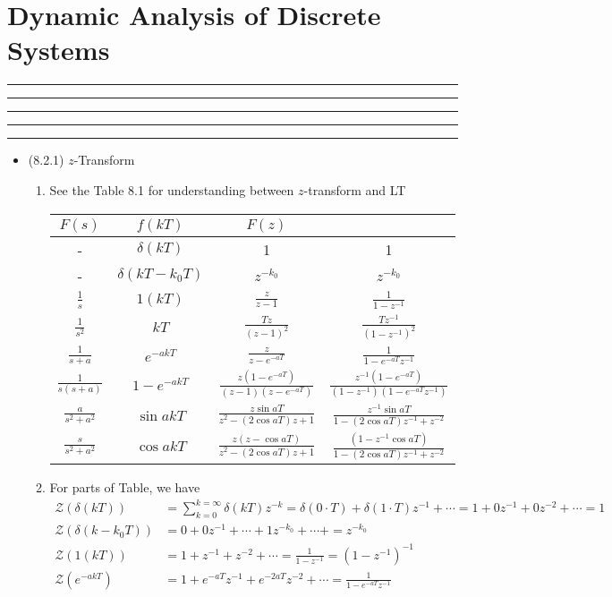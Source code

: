 \setcounter{chapter}{7}
\setcounter{section}{1}
\section{Dynamic Analysis of Discrete Systems}
\vspace{-8pt} \hrule \hrule \hrule \hrule \hrule  \vspace{12pt}

\begin{itemize}	

\item (8.2.1) $z$-Transform 
	\begin{enumerate}
		\item See the Table 8.1 for understanding between $z$-transform and LT
		\begin{table}[h]
		\centering
			\begin{tabular}{c||c||c|c} 
				\hline \hline 
				$F(s)$ & $f(kT)$ & $F(z)$ & \\ \hline
				- & $\delta(kT)$ & 1 & 1 \\
				- & $\delta(kT-k_0 T)$ & $z^{-k_0}$ & $z^{-k_0}$ \\
				$\frac{1}{s}$ & $1(kT)$ & $\frac{z}{z-1}$ & $\frac{1}{1-z^{-1}}$ \\
				$\frac{1}{s^2}$ & $kT$ & $\frac{Tz}{(z-1)^2}$ & $\frac{Tz^{-1}}{(1-z^{-1})^2} $ \\
				$\frac{1}{s+a}$ & $e^{-akT}$ & $\frac{z}{z-e^{-aT}}$ & $\frac{1}{1-e^{-aT}z^{-1}}$ \\
				$\frac{1}{s(s+a)}$ & $1-e^{-akT}$ & $\frac{z(1-e^{-aT})}{(z-1)(z-e^{-aT})}$ & $\frac{z^{-1}(1-e^{-aT})}{(1-z^{-1})(1-e^{-aT} z^{-1})}$ \\
				$\frac{a}{s^2+a^2}$ & $\sin a kT$ & $\frac{z \sin aT}{z^2-(2\cos aT)z +1}$ & $\frac{z^{-1}  \sin aT}{1-(2\cos aT)z^{-1} + z^{-2}}$ \\
				$\frac{s}{s^2+a^2}$ & $\cos a kT$ & $\frac{z(z- \cos aT)}{z^2-(2\cos aT)z +1}$ & $\frac{(1- z^{-1}\cos aT )}{1-(2\cos aT)z^{-1} +z^{-2}}$ \\
				\hline \hline 
			\end{tabular}
		\end{table}
		\item For parts of Table, we have
		\begin{align*}
			\mathcal{Z}(\delta(kT)) &=\sum_{k=0}^{k=\infty}\delta(kT)z^{-k}= \delta(0 \cdot T) + \delta(1 \cdot T)z^{-1} + \cdots  = 1  + 0 z^{-1} + 0 z^{-2} + \cdots = 1  \\  
			\mathcal{Z}(\delta(k-k_0T)) &= 0  + 0 z^{-1} +  \cdots + 1 z^{-k_0} + \cdots +  = z^{-k_0}  \\  
			\mathcal{Z}(1(kT)) &= 1 + z^{-1} + z^{-2} + \cdots = \frac{1}{1-z^{-1}} = (1-z^{-1})^{-1}  \\
			\mathcal{Z}(e^{-akT}) &= 1 + e^{-aT} z^{-1} + e^{-2aT} z^{-2} + \cdots = \frac{1}{1-e^{-aT}z^{-1}} \\
		\end{align*}
	\end{enumerate}

\end{itemize}			